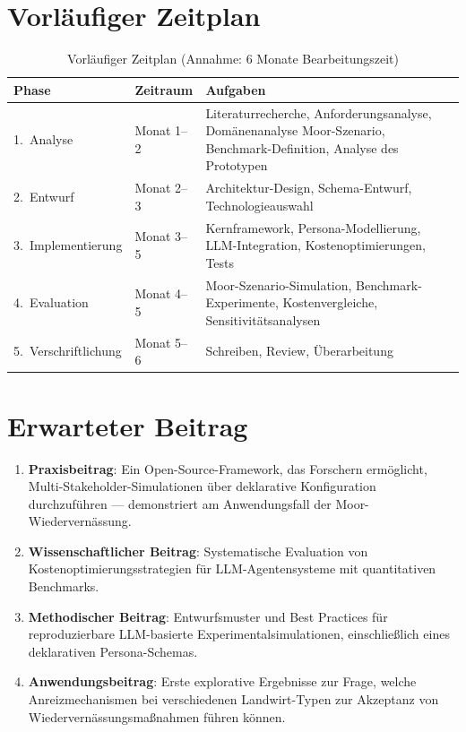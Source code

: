 \documentclass[12pt, a4paper]{article}
\begin{document}
\section{Vorläufiger Zeitplan}

\begin{table}[h!]
    \centering
    \begin{tabularx}{\textwidth}{llX}
        \toprule
        \textbf{Phase} & \textbf{Zeitraum} & \textbf{Aufgaben} \\
        \midrule
        1.\ Analyse
            & Monat 1--2
            & Literaturrecherche, Anforderungsanalyse, Domänenanalyse Moor-Szenario, Benchmark-Definition, Analyse des Prototypen \\
        2.\ Entwurf
            & Monat 2--3
            & Architektur-Design, Schema-Entwurf, Technologieauswahl \\
        3.\ Implementierung
            & Monat 3--5
            & Kernframework, Persona-Modellierung, LLM-Integration, Kostenoptimierungen, Tests \\
        4.\ Evaluation
            & Monat 4--5
            & Moor-Szenario-Simulation, Benchmark-Experimente, Kostenvergleiche, Sensitivitätsanalysen \\
        5.\ Verschriftlichung
            & Monat 5--6
            & Schreiben, Review, Überarbeitung \\
        \bottomrule
    \end{tabularx}
    \caption{Vorläufiger Zeitplan (Annahme: 6 Monate Bearbeitungszeit)}
    \label{tab:zeitplan}
\end{table}

\section{Erwarteter Beitrag}

\begin{enumerate}
    \item \textbf{Praxisbeitrag}: Ein Open-Source-Framework, das Forschern ermöglicht, Multi-Stakeholder-Simulationen über deklarative Konfiguration durchzuführen --- demonstriert am Anwendungsfall der Moor-Wiedervernässung.
    \item \textbf{Wissenschaftlicher Beitrag}: Systematische Evaluation von Kostenoptimierungsstrategien für LLM-Agentensysteme mit quantitativen Benchmarks.
    \item \textbf{Methodischer Beitrag}: Entwurfsmuster und Best Practices für reproduzierbare LLM-basierte Experimentalsimulationen, einschließlich eines deklarativen Persona-Schemas.
    \item \textbf{Anwendungsbeitrag}: Erste explorative Ergebnisse zur Frage, welche Anreizmechanismen bei verschiedenen Landwirt-Typen zur Akzeptanz von Wiedervernässungsmaßnahmen führen können.
\end{enumerate}
\end{document}
